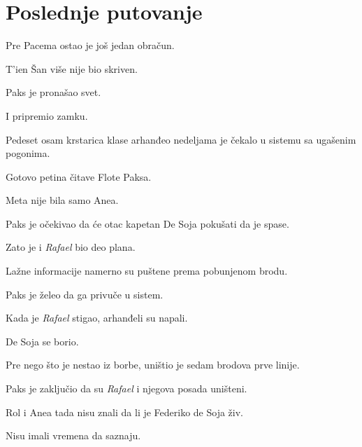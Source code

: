 
\chapter{Poslednje putovanje}


Pre Pacema ostao je još jedan obračun.

\bigskip

T'ien Šan više nije bio skriven.

\bigskip

Paks je pronašao svet.

I pripremio zamku.

\bigskip

Pedeset osam krstarica klase arhanđeo nedeljama je čekalo u sistemu sa ugašenim pogonima.

Gotovo petina čitave Flote Paksa.

\bigskip

Meta nije bila samo Anea.

\bigskip

Paks je očekivao da će otac kapetan De Soja pokušati da je spase.

\bigskip

Zato je i \emph{Rafael} bio deo plana.

\bigskip

Lažne informacije namerno su puštene prema pobunjenom brodu.

Paks je želeo da ga privuče u sistem.

\bigskip

Kada je \emph{Rafael} stigao, arhanđeli su napali.

\bigskip

De Soja se borio.

\bigskip

Pre nego što je nestao iz borbe, uništio je sedam brodova prve linije.

\bigskip

Paks je zaključio da su \emph{Rafael} i njegova posada uništeni.

\bigskip

Rol i Anea tada nisu znali da li je Federiko de Soja živ.

\bigskip

Nisu imali vremena da saznaju.

\bigskip

